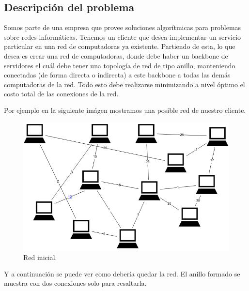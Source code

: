 \subsection{Descripci\'on del problema}

Somos parte de una empresa que provee soluciones algorítmicas para problemas sobre redes informáticas. Tenemos un cliente que desea implementar un servicio particular en una red de computadoras ya existente.
Partiendo de esta, lo que desea es crear una red de computadoras, donde debe haber un backbone de servidores el cuál debe tener una topología de red de tipo anillo, manteniendo conectadas (de forma directa o indirecta) a este backbone a todas las demás computadoras de la red.
Todo esto debe realizarse minimizando a nivel óptimo el costo total de las conexiones de la red.

Por ejemplo en la siguiente imágen mostramos una posible red de nuestro cliente.

\begin{figure}[H]
\begin{center}
\includegraphics[scale=.35]{./imagenes/ej3_ejemplo1.png}
\caption{Red inicial.}
\end{center}
\end{figure}

Y a continuación se puede ver como debería quedar la red. El anillo formado se muestra con dos conexiones solo para resaltarla.

